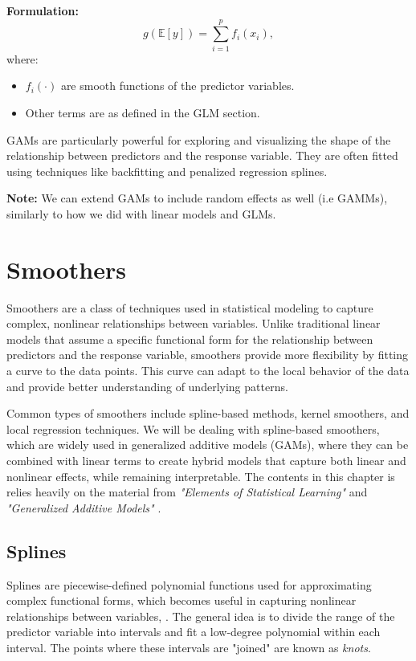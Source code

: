 \documentclass[12pt, twoside,hidelinks]{article}
\theoremstyle{definition}
\numberwithin{equation}{section}
\begin{document}
\textbf{Formulation:}
\begin{equation}
    g(\mathbb{E}[y]) = \sum_{i=1}^{p} f_i(x_i),
    \label{eq:gam_general_form}
\end{equation}
where:
\begin{itemize}
    \item \( f_i(\cdot) \) are smooth functions of the predictor variables.
    \item Other terms are as defined in the GLM section.
\end{itemize}

GAMs are particularly powerful for exploring and visualizing the shape of the relationship between predictors and the response variable. They are often fitted using techniques like backfitting and penalized regression splines. 

\textbf{Note:} We can extend GAMs to include random effects as well (i.e GAMMs), similarly to how we did with linear models and GLMs.

\section{Smoothers}\label{sec:smooth}

Smoothers are a class of techniques used in statistical modeling to capture complex, nonlinear relationships between variables. Unlike traditional linear models that assume a specific functional form for the relationship between predictors and the response variable, smoothers provide more flexibility by fitting a curve to the data points.
This curve can adapt to the local behavior of the data and provide better understanding of underlying patterns.
\newline

Common types of smoothers include spline-based methods, kernel smoothers, and local regression techniques. We will be dealing with spline-based smoothers, which are widely used in generalized additive models (GAMs), where they can be combined with linear terms to create hybrid models that capture both linear and nonlinear effects, while remaining interpretable. The contents in this chapter is relies heavily on the material from \textit{"Elements of Statistical Learning"} \citep{hastie} and \textit{"Generalized Additive Models"} \citet{wood2017}.

\subsection{Splines}\label{sec:smooth:splines}
Splines are piecewise-defined polynomial functions used for approximating complex functional forms, which becomes useful in capturing nonlinear relationships between variables, \citep[Chapter 5.2]{hastie}. The general idea is to divide the range of the predictor variable into intervals and fit a low-degree polynomial within each interval. The points where these intervals are "joined" are known as \textit{knots}. 
\newline
\end{document}
